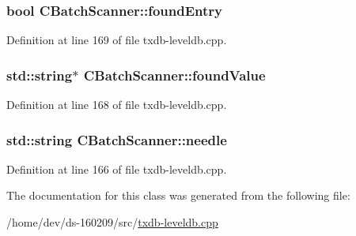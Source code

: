 \subsubsection[{found\+Entry}]{\setlength{\rightskip}{0pt plus 5cm}bool C\+Batch\+Scanner\+::found\+Entry}\label{class_c_batch_scanner_ad2669c1d3fbd8c206b1f42348dde8cf0}


Definition at line 169 of file txdb-\/leveldb.\+cpp.

\hypertarget{class_c_batch_scanner_a3a82f2f7068f469eb535435a0b9ae640}{}
\subsubsection[{found\+Value}]{\setlength{\rightskip}{0pt plus 5cm}std\+::string$\ast$ C\+Batch\+Scanner\+::found\+Value}\label{class_c_batch_scanner_a3a82f2f7068f469eb535435a0b9ae640}


Definition at line 168 of file txdb-\/leveldb.\+cpp.

\hypertarget{class_c_batch_scanner_ae04f7151c91676f9f6209737cdc3d086}{}
\subsubsection[{needle}]{\setlength{\rightskip}{0pt plus 5cm}std\+::string C\+Batch\+Scanner\+::needle}\label{class_c_batch_scanner_ae04f7151c91676f9f6209737cdc3d086}


Definition at line 166 of file txdb-\/leveldb.\+cpp.



The documentation for this class was generated from the following file\+:\begin{DoxyCompactItemize}
\item 
/home/dev/ds-\/160209/src/\hyperlink{txdb-leveldb_8cpp}{txdb-\/leveldb.\+cpp}\end{DoxyCompactItemize}
